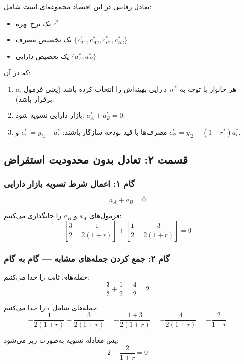 \documentclass[12pt,a4paper]{article}
\begin{document}
تعادل رقابتی در این اقتصاد مجموعه‌ای است شامل:

\begin{itemize}
	\item یک نرخ بهره $r^*$
	\item یک تخصیص مصرف $\{c_{A1}^*, c_{A2}^*, c_{B1}^*, c_{B2}^*\}$
	\item یک تخصیص دارایی $\{a_A^*, a_B^*\}$
\end{itemize}

که در آن:

\begin{enumerate}
	\item هر خانوار با توجه به $r^*$، دارایی بهینه‌اش را انتخاب کرده باشد (یعنی فرمول $a_i$ برقرار باشد).
	\item بازار دارایی تسویه شود: $a_A^* + a_B^* = 0$.
	\item مصرف‌ها با قید بودجه سازگار باشند: $c_{i1}^* = y_{i1} - a_i^*$ و $c_{i2}^* = y_{i2} + (1+r^*) a_i^*$.
\end{enumerate}

\subsection{قسمت ۲: تعادل بدون محدودیت استقراض}

\subsubsection{گام ۱: اعمال شرط تسویه بازار دارایی}

\[
	a_A + a_B = 0
\]

فرمول‌های $a_A$ و $a_B$ را جایگذاری می‌کنیم:
\[
	\left[ \frac{3}{2} - \frac{1}{2(1+r)} \right] + \left[ \frac{1}{2} - \frac{3}{2(1+r)} \right] = 0
\]

\subsubsection{گام ۲: جمع کردن جمله‌های مشابه — گام به گام}

جمله‌های ثابت را جدا می‌کنیم:
\[
	\frac{3}{2} + \frac{1}{2} = \frac{4}{2} = 2
\]

جمله‌های شامل $r$ را جدا می‌کنیم:
\[
	-\frac{1}{2(1+r)} - \frac{3}{2(1+r)} = -\frac{1+3}{2(1+r)} = -\frac{4}{2(1+r)} = -\frac{2}{1+r}
\]

پس معادله تسویه به‌صورت زیر می‌شود:
\[
	2 - \frac{2}{1+r} = 0
\]
\end{document}
